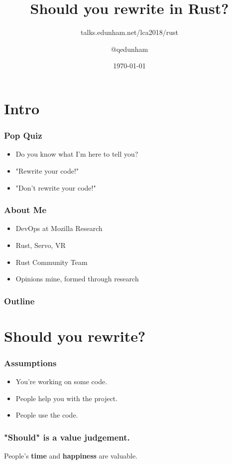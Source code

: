 \documentclass{beamer}
\title{Should you rewrite in Rust?}
\subtitle{talks.edunham.net/lca2018/rust}
\author{$@$qedunham}
\institute{LinuxConf Australia}
\date{\today}
\begin{document}
\begin{frame}[fragile]
\titlepage
\end{frame}


\section{Intro}

\begin{frame}[fragile]
\frametitle{Pop Quiz}
\begin{itemize}
\item Do you know what I'm here to tell you? \pause
\item "Rewrite your code!" \pause
\item "Don't rewrite your code!" \pause
\end{itemize}
\end{frame}


\begin{frame}[fragile]
\frametitle{About Me}
\begin{itemize}
\item DevOps at Mozilla Research
\item Rust, Servo, VR
\item Rust Community Team
\item Opinions mine, formed through research
\end{itemize}
\end{frame}

\begin{frame}[fragile]
\frametitle{Outline}
\tableofcontents[pausesections]
\end{frame}

\section{Should you rewrite?}

\begin{frame}[fragile]
\frametitle{Assumptions}
\begin{itemize}
\item You're working on some code.
\item People help you with the project.
\item People use the code.
\end{itemize}
\end{frame}

\begin{frame}[fragile]
\frametitle{"Should" is a value judgement.}
People's \textbf{time} and \textbf{happiness} are valuable.
\end{frame}
\end{document}
